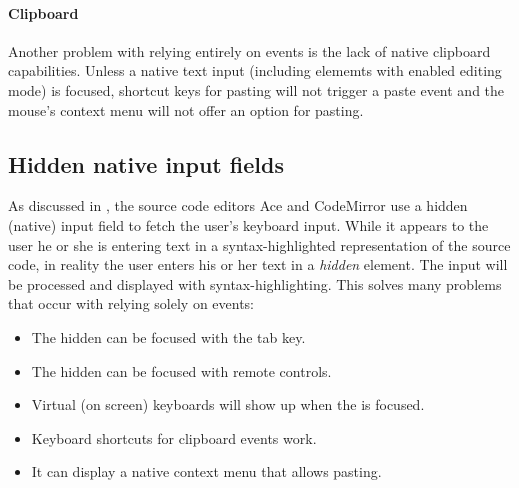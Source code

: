 \paragraph{Clipboard} Another problem with relying entirely on events is the lack of native clipboard capabilities. Unless a native text input (including elememts with enabled editing mode) is focused, shortcut keys for pasting will not trigger a paste event and the mouse's context menu will not offer an option for pasting. %

\subsection{Hidden native input fields} 

\label{subsec:hidden_native_input_fields}

As discussed in , the source code editors Ace and CodeMirror use a hidden (native) input field to fetch the user's keyboard input. While it appears to the user he or she is entering text in a syntax-highlighted representation of the source code, in reality the user enters his or her text in a \textit{hidden}  element. The input will be processed and displayed with syntax-highlighting. This solves many problems that occur with relying solely on events:

\begin{itemize}
\item The hidden  can be focused with the tab key.
\item The hidden  can be focused with remote controls.
\item Virtual (on screen) keyboards will show up when the  is focused.
\item Keyboard shortcuts for clipboard events work.
\item It can display a native context menu that allows pasting.
\end{itemize}

